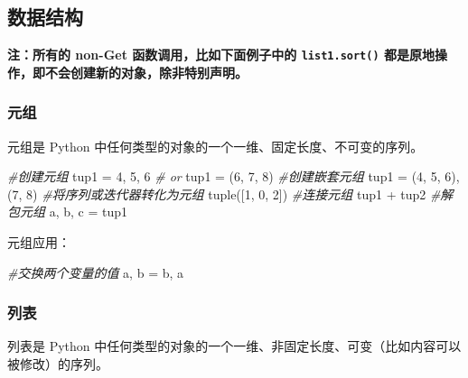 \documentclass[]{article}
\newenvironment{Shaded}{}{}
\newcommand{\DecValTok}[1]{\textcolor[rgb]{0.25,0.63,0.44}{#1}}
\newcommand{\CommentTok}[1]{\textcolor[rgb]{0.38,0.63,0.69}{\textit{#1}}}
\newcommand{\OperatorTok}[1]{\textcolor[rgb]{0.40,0.40,0.40}{#1}}
\newcommand{\BuiltInTok}[1]{#1}
\newcommand{\NormalTok}[1]{#1}
\begin{document}
\hypertarget{header-n128}{\subsection{数据结构}\label{header-n128}}

\textbf{注：所有的 non-Get 函数调用，比如下面例子中的
\texttt{list1.sort()} 都是原地操作，即不会创建新的对象，除非特别声明。}

\subsubsection{元组}\label{header-n131}

元组是 Python 中任何类型的对象的一个一维、固定长度、不可变的序列。

\begin{Shaded}
\begin{Highlighting}[]
\CommentTok{#创建元组}
\NormalTok{tup1 }\OperatorTok{=} \DecValTok{4}\NormalTok{, }\DecValTok{5}\NormalTok{, }\DecValTok{6} 
\CommentTok{# or}
\NormalTok{tup1 }\OperatorTok{=}\NormalTok{ (}\DecValTok{6}\NormalTok{, }\DecValTok{7}\NormalTok{, }\DecValTok{8}\NormalTok{)}
\CommentTok{#创建嵌套元组}
\NormalTok{tup1 }\OperatorTok{=}\NormalTok{ (}\DecValTok{4}\NormalTok{, }\DecValTok{5}\NormalTok{, }\DecValTok{6}\NormalTok{), (}\DecValTok{7}\NormalTok{, }\DecValTok{8}\NormalTok{)}
\CommentTok{#将序列或迭代器转化为元组}
\BuiltInTok{tuple}\NormalTok{([}\DecValTok{1}\NormalTok{, }\DecValTok{0}\NormalTok{, }\DecValTok{2}\NormalTok{])}
\CommentTok{#连接元组}
\NormalTok{tup1 }\OperatorTok{+}\NormalTok{ tup2}
\CommentTok{#解包元组}
\NormalTok{a, b, c }\OperatorTok{=}\NormalTok{ tup1}
\end{Highlighting}
\end{Shaded}

元组应用：

\begin{Shaded}
\begin{Highlighting}[]
\CommentTok{#交换两个变量的值}
\NormalTok{a, b }\OperatorTok{=}\NormalTok{ b, a}
\end{Highlighting}
\end{Shaded}

\subsubsection{列表}\label{header-n138}

列表是 Python
中任何类型的对象的一个一维、非固定长度、可变（比如内容可以被修改）的序列。
\end{document}
